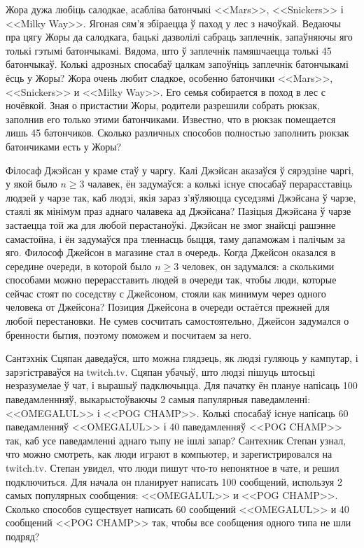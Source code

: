 \documentclass[11pt,twoside]{article}
\begin{document}
\begin{problemList}
\bigskip

\problemItemSimple
{Жора дужа любіць салодкае, асабліва батончыкі <<Mars>>, <<Snickers>> і <<Milky Way>>.
Ягоная сям'я збіраецца ў паход у лес з начоўкай.
Ведаючы пра цягу Жоры да салодкага, бацькі дазволілі сабраць заплечнік, запаўняючы яго толькі гэтымі батончыкамі.
Вядома, што ў заплечнік памяшчаецца толькі 45 батончыкаў.
Колькі адрозных спосабаў цалкам запоўніць заплечнік батончыкамі ёсць у Жоры?}
{Жора очень любит сладкое, особенно батончики <<Mars>>, <<Snickers>> и <<Milky Way>>.
Его семья собирается в поход в лес с ночёвкой.
Зная о пристастии Жоры, родители разрешили собрать рюкзак, заполнив его только этими батончиками.
Известно, что в рюкзак помещается лишь 45 батончиков.
Сколько различных способов полностью заполнить рюкзак батончиками есть у Жоры?}

\bigskip

\problemItemSimple
{Філосаф Джэйсан у краме стаў у чаргу.
Калі Джэйсан аказаўся ў сярэдзіне чаргі, у якой было $n \ge 3$ чалавек, ён задумаўся: а колькі існуе спосабаў перарасставіць людзей у чарзе так,
каб людзі, якія зараз з'яўляюцца суседзямі Джэйсана ў чарзе, стаялі як мінімум праз аднаго чалавека ад Джэйсана?
Пазіцыя Джэйсана ў чарзе застаецца той жа для любой перастаноўкі.
Джэйсан не змог знайсці рашэнне самастойна, і ён задумаўся пра тленнасць быцця, таму дапаможам і палічым за яго.}
{Философ Джейсон в магазине стал в очередь.
Когда Джейсон оказался в середине очереди, в которой было $n \ge 3$ человек, он задумался: а сколькими способами можно перерасставить людей в очереди так,
чтобы люди, которые сейчас стоят по соседству с Джейсоном, стояли как минимум через одного человека от Джейсона?
Позиция Джейсона в очереди остаётся прежней для любой перестановки.
Не сумев сосчитать самостоятельно, Джейсон задумался о бренности бытия, поэтому поможем и посчитаем за него.}

\bigskip

\problemItemSimple
{Сантэхнік Сцяпан даведаўся, што можна глядзець, як людзі гуляюць у кампутар, і зарэгістраваўся на twitch.tv. Сцяпан убачыў, што людзі пішуць штосьці незразумелае ў чат, і вырашыў падключыцца.
Для пачатку ён плануе напісаць 100 паведамленнняў, выкарыстоўваючы 2 самыя папулярныя паведамленні: <<OMEGALUL>> і <<POG CHAMP>>.
Колькі спосабаў існуе напісаць 60 паведамленняў <<OMEGALUL>> і 40 паведамленняў <<POG CHAMP>> так, каб усе паведамленні аднаго тыпу не ішлі запар?}
{Сантехник Степан узнал, что можно смотреть, как люди играют в компьютер, и зарегистрировался на twitch.tv.
Степан увидел, что люди пишут что-то непонятное в чате, и решил подключиться.
Для начала он планирует написать 100 сообщений, используя 2 самых популярных сообщения: <<OMEGALUL>> и <<POG CHAMP>>.
Сколько способов существует написать 60 сообщений <<OMEGALUL>> и 40 сообщений <<POG CHAMP>> так, чтобы все сообщения одного типа не шли подряд?}

\end{problemList}
\end{document}
